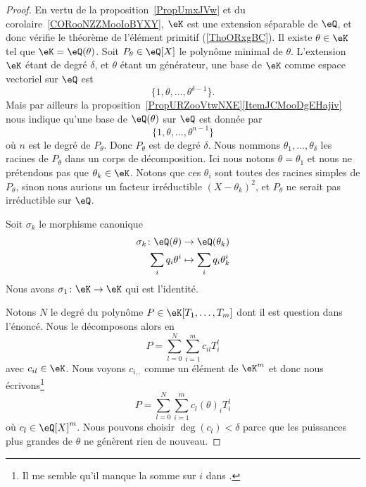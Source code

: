 \begin{proof}
	En vertu de la proposition~\ref{PropUmxJVw} et du corolaire~\ref{CORooNZZMooIoBYXY}, \( \eK\) est une extension séparable de \( \eQ\), et donc vérifie le théorème de l'élément primitif (\ref{ThoORxgBC}). Il existe \( \theta\in \eK\) tel que \( \eK=\eQ(\theta)\). Soit \( P_{\theta}\in\eQ[X]\) le polynôme minimal de \( \theta\). L'extension \( \eK\) étant de degré \( \delta\), et \( \theta\) étant un générateur, une base de \( \eK\) comme espace vectoriel sur \( \eQ\) est
	\begin{equation}
		\{ 1,\theta,\ldots, \theta^{\delta-1} \}.
	\end{equation}
	Mais par ailleurs la proposition~\ref{PropURZooVtwNXE}\ref{ItemJCMooDgEHajiv} nous indique qu'une base de \( \eQ(\theta)\) sur \( \eQ\) est donnée par
	\begin{equation}
		\{ 1,\theta,\ldots, \theta^{n-1} \}
	\end{equation}
	où \( n\) est le degré de \( P_{\theta}\). Donc \( P_{\theta}\) est de degré \( \delta\). Nous nommons \( \theta_1,\ldots, \theta_{\delta}\) les racines de \( P_{\theta}\) dans un corps de décomposition. Ici nous notons \( \theta=\theta_1\) et nous ne prétendons pas que \( \theta_k\in \eK\). Notons que ces \( \theta_i\) sont toutes des racines simples de \( P_{\theta}\), sinon nous aurions un facteur irréductible \( (X-\theta_k)^2\), et \( P_{\theta}\) ne serait pas irréductible sur \( \eQ\).

	Soit \( \sigma_k\) le morphisme canonique
	\begin{equation}
		\begin{aligned}
			\sigma_k\colon \eQ(\theta) & \to \eQ(\theta_k)           \\
			\sum_i q_i\theta^i         & \mapsto \sum_iq_i\theta_k^i
		\end{aligned}
	\end{equation}
	Nous avons \( \sigma_1\colon \eK\to \eK\) qui est l'identité.

	Notons \( N\) le degré du polynôme \( P\in \eK[T_1,\ldots, T_m]\) dont il est question dans l'énoncé. Nous le décomposons alors en
	\begin{equation}
		P=\sum_{l=0}^N\sum_{i=1}^mc_{il}T_i^l
	\end{equation}
	avec \( c_{il}\in \eK\). Nous voyons \( c_{i,.}\) comme un élément de \( \eK^m\) et donc nous écrivons\footnote{Il me semble qu'il manque la somme sur \( i\) dans \cite{fJhCTE}.}
	\begin{equation}
		P=\sum_{l=0}^N\sum_{i=1}^m c_l(\theta)_iT_i^l
	\end{equation}
	où \( c_l\in \eQ[X]^m\). Nous pouvons choisir \( \deg(c_l)<\delta\) parce que les puissances plus grandes de \( \theta\) ne génèrent rien de nouveau.


\end{proof}
